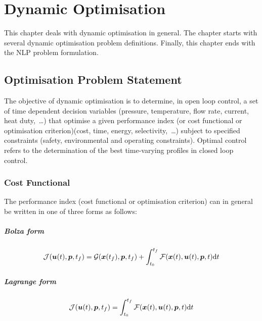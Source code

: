 \chapter{Dynamic Optimisation}
\label{cha:do}

This chapter deals with dynamic optimisation in general. The chapter
starts with several dynamic optimisation problem definitions. Finally,
this chapter ends with the NLP problem formulation. 

\section{Optimisation Problem Statement}
\label{sec:ops}

The objective of dynamic optimisation is to determine, in open loop
control, a set of time dependent decision variables (pressure,
temperature, flow rate, current, heat duty,~\ldots) that optimise a
given performance index (or cost functional or optimisation
criterion)(cost, time, energy, selectivity,~\ldots) subject to
specified constraints (safety, environmental and operating
constraints). Optimal control refers to the determination of the best
time-varying profiles in closed loop control.

\subsection{Cost Functional}
\label{sec:cf}

The performance index (cost functional or optimisation criterion) can
in general be written in one of three forms as follows:
\paragraph{Bolza form}
\begin{equation}
\mf{J}(\ve{u}(t),\ve{p},t_{f}) = \mf{G}(\ve{x}(t_{f}),\ve{p},t_{f}) +
\int_{t_{0}}^{t_{f}}\mf{F}(\ve{x}(t),\ve{u}(t),\ve{p},t)\dt
\label{eq:bolza} 
\end{equation} 
\paragraph{Lagrange form}
\begin{equation}
\mf{J}(\ve{u}(t),\ve{p},t_{f}) =
\int_{t_{0}}^{t_{f}}\mf{F}(\ve{x}(t),\ve{u}(t),\ve{p},t)\dt
\label{eq:lagrange}
\end{equation} 
